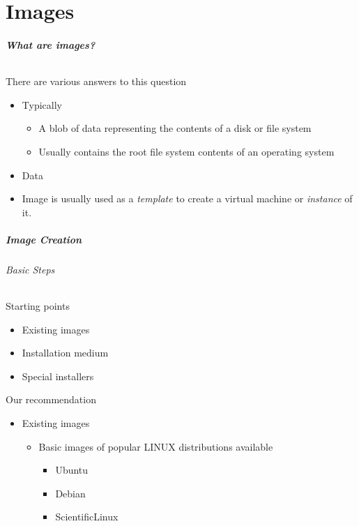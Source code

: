 \part{Images}

\begin{frame}
\frametitle{What are images?}
\framesubtitle{}
There are various answers to this question
\begin{itemize}
\item Typically
  \begin{itemize}
  \item A blob of data representing the contents of a disk or file system
  \item Usually contains the root file system contents of an operating system
  \end{itemize}
\item Data
\item Image is usually used as a \emph{template} to create a virtual
  machine or \emph{instance} of it.
\end{itemize}
\end{frame}

\begin{frame}
\frametitle{Image Creation}
\framesubtitle{Basic Steps}
Starting points
\begin{itemize}
\item Existing images
\item Installation medium
\item Special installers
\end{itemize}
Our recommendation
\begin{itemize}
\item Existing images
  \begin{itemize}
  \item Basic images of popular LINUX distributions available
    \begin{itemize}
    \item Ubuntu
    \item Debian
    \item ScientificLinux
    \end{itemize}
  \end{itemize}
\end{itemize}
\end{frame}

